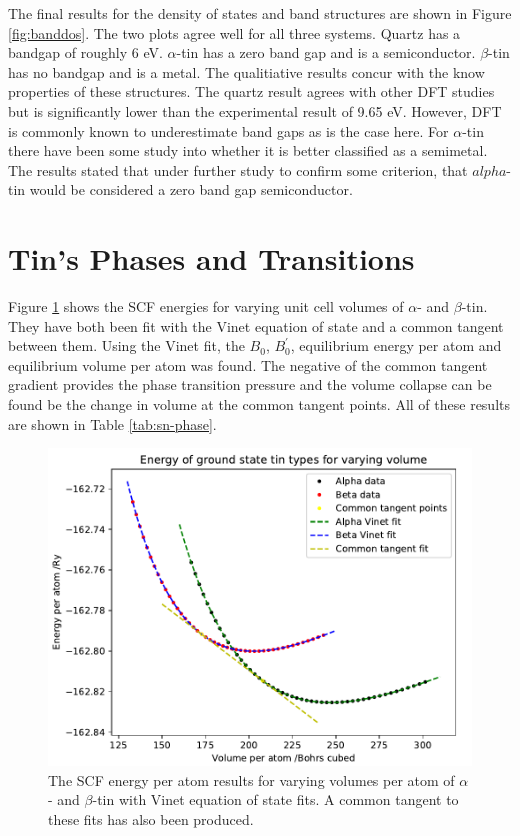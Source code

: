 \documentclass[12pt]{article}
\begin{document}
\bigskip

\noindent The final results for the density of states and band structures are shown in Figure \ref{fig:banddos}. The two plots agree well for all three systems. Quartz has a bandgap of roughly 6 eV. $\alpha$-tin has a zero band gap and is a semiconductor. $\beta$-tin has no bandgap and is a metal. The qualitiative results concur with the know properties of these structures. The quartz result agrees with other DFT studies\cite{qdft} but is significantly lower than the experimental result of 9.65 eV\cite{qexp}. However, DFT is commonly known to underestimate band gaps as is the case here. For $\alpha$-tin there have been some study into whether it is better classified as a semimetal\cite{asemi}. The results stated that under further study to confirm some criterion, that $alpha$-tin would be considered a zero band gap semiconductor.

\clearpage
\section*{Tin's Phases and Transitions}

Figure \ref{fig:sn-phase} shows the SCF energies for varying unit cell volumes of $\alpha$- and $\beta$-tin. They have both been fit with the Vinet equation of state and a common tangent between them. Using the Vinet fit, the $B_0$, $B_0^{\prime}$, equilibrium energy per atom and equilibrium volume per atom was found. The negative of the common tangent gradient provides the phase transition pressure and the volume collapse can be found be the change in volume at the common tangent points. All of these results are shown in Table \ref{tab:sn-phase}.

\begin{figure}[h!!!!!]
\centering
\includegraphics[width=12cm]{sn-phase-data/sn-phase.pdf}
\caption{The SCF energy per atom results for varying volumes per atom of $\alpha$- and $\beta$-tin with Vinet equation of state fits. A common tangent to these fits has also been produced.}
\label{fig:sn-phase}
\end{figure}
\end{document}
